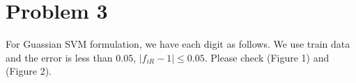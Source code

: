 \documentclass[11pt]{article}
\begin{document}
\section{Problem 3}
For Guassian SVM formulation, we have each digit as follows. We use train data and the error is less than $0.05$, $|f_{iR} - 1| \le 0.05 $. Please check (Figure 1) and (Figure 2).
\begin{figure}[htbp]
\begin{center}

\end{center}
\end{figure}
\end{document}
